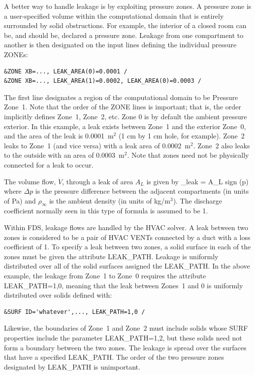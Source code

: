 \documentclass[11pt]{book}
\begin{document}
A better way to handle leakage is by exploiting pressure zones. A pressure zone is a user-specified volume within the computational domain that is
entirely surrounded by solid obstructions. For example, the interior of a closed room can be, and should be, declared a pressure zone. Leakage from one
compartment to another is then designated on the input lines defining the individual pressure {\ct ZONE}s:
\begin{lstlisting}
&ZONE XB=..., LEAK_AREA(0)=0.0001 /
&ZONE XB=..., LEAK_AREA(1)=0.0002, LEAK_AREA(0)=0.0003 /
\end{lstlisting}
The first line designates a region of the computational domain to be Pressure Zone~1. Note that the order of the {\ct ZONE} lines is important; that is, the order implicitly defines Zone~1, Zone~2, etc. Zone 0 is by default the ambient pressure exterior. In this example, a leak exists between Zone~1 and the exterior Zone~0, and the area of the leak is 0.0001~m$^2$ (1 cm by 1 cm hole, for example). Zone~2 leaks to Zone~1 (and vice versa) with a leak area of 0.0002~m$^2$. Zone~2 also leaks to the outside with an area of 0.0003~m$^2$. Note that zones need not be physically connected for a leak to occur.

The volume flow, $\dot{V}$, through a leak of area $A_L$ is given by
\be  {}_{\rm leak} = A_L \; \hbox{sign} (\Delta p) \;  \ee
where $\Delta p$ is the pressure difference between the adjacent compartments (in units of Pa) and
$\rho_\infty$ is the ambient density (in units of kg/m$^3$). The discharge coefficient normally seen in this type of formula is assumed
to be 1.

Within FDS, leakage flows are handled by the HVAC solver.  A leak between two zones is considered to be a pair of HVAC {\ct VENT}s connected by a duct with a loss coefficient of 1.  To specify a leak between two zones, a solid surface in each of the zones must be given the attribute {\ct LEAK\_PATH}.  Leakage is uniformly distributed over all of the solid surfaces assigned the {\ct LEAK\_PATH}.  In the above example, the leakage from Zone~1 to Zone~0 requires the attribute
{\ct LEAK\_PATH=1,0}, meaning that the leak between Zones~1 and 0 is uniformly distributed
over solids defined with:
\begin{lstlisting}
&SURF ID='whatever',..., LEAK_PATH=1,0 /
\end{lstlisting}
Likewise, the boundaries of Zone~1 and Zone~2 must include solids whose {\ct SURF} properties include the parameter {\ct LEAK\_PATH=1,2}, but these solids need not form a boundary between the two zones. The leakage is spread over the surfaces that have a specified {\ct LEAK\_PATH}. The order of the two pressure zones designated by {\ct LEAK\_PATH} is unimportant.
\end{document}
